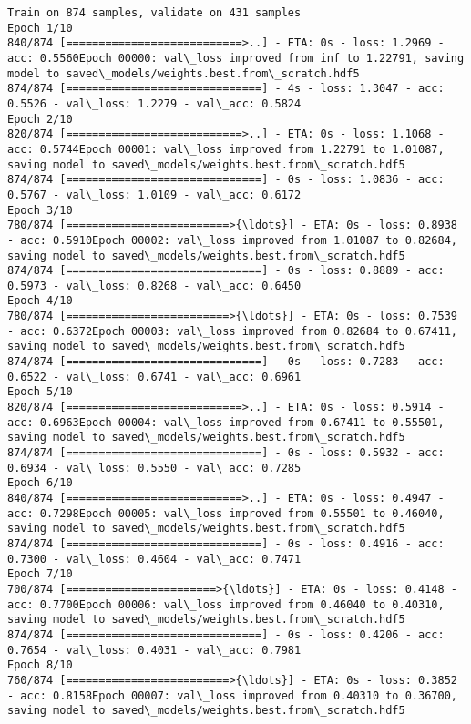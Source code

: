 \documentclass[11pt]{article}
\begin{document}
    \begin{Verbatim}[commandchars=\\\{\}]
Train on 874 samples, validate on 431 samples
Epoch 1/10
840/874 [===========================>..] - ETA: 0s - loss: 1.2969 - acc: 0.5560Epoch 00000: val\_loss improved from inf to 1.22791, saving model to saved\_models/weights.best.from\_scratch.hdf5
874/874 [==============================] - 4s - loss: 1.3047 - acc: 0.5526 - val\_loss: 1.2279 - val\_acc: 0.5824
Epoch 2/10
820/874 [===========================>..] - ETA: 0s - loss: 1.1068 - acc: 0.5744Epoch 00001: val\_loss improved from 1.22791 to 1.01087, saving model to saved\_models/weights.best.from\_scratch.hdf5
874/874 [==============================] - 0s - loss: 1.0836 - acc: 0.5767 - val\_loss: 1.0109 - val\_acc: 0.6172
Epoch 3/10
780/874 [=========================>{\ldots}] - ETA: 0s - loss: 0.8938 - acc: 0.5910Epoch 00002: val\_loss improved from 1.01087 to 0.82684, saving model to saved\_models/weights.best.from\_scratch.hdf5
874/874 [==============================] - 0s - loss: 0.8889 - acc: 0.5973 - val\_loss: 0.8268 - val\_acc: 0.6450
Epoch 4/10
780/874 [=========================>{\ldots}] - ETA: 0s - loss: 0.7539 - acc: 0.6372Epoch 00003: val\_loss improved from 0.82684 to 0.67411, saving model to saved\_models/weights.best.from\_scratch.hdf5
874/874 [==============================] - 0s - loss: 0.7283 - acc: 0.6522 - val\_loss: 0.6741 - val\_acc: 0.6961
Epoch 5/10
820/874 [===========================>..] - ETA: 0s - loss: 0.5914 - acc: 0.6963Epoch 00004: val\_loss improved from 0.67411 to 0.55501, saving model to saved\_models/weights.best.from\_scratch.hdf5
874/874 [==============================] - 0s - loss: 0.5932 - acc: 0.6934 - val\_loss: 0.5550 - val\_acc: 0.7285
Epoch 6/10
840/874 [===========================>..] - ETA: 0s - loss: 0.4947 - acc: 0.7298Epoch 00005: val\_loss improved from 0.55501 to 0.46040, saving model to saved\_models/weights.best.from\_scratch.hdf5
874/874 [==============================] - 0s - loss: 0.4916 - acc: 0.7300 - val\_loss: 0.4604 - val\_acc: 0.7471
Epoch 7/10
700/874 [=======================>{\ldots}] - ETA: 0s - loss: 0.4148 - acc: 0.7700Epoch 00006: val\_loss improved from 0.46040 to 0.40310, saving model to saved\_models/weights.best.from\_scratch.hdf5
874/874 [==============================] - 0s - loss: 0.4206 - acc: 0.7654 - val\_loss: 0.4031 - val\_acc: 0.7981
Epoch 8/10
760/874 [=========================>{\ldots}] - ETA: 0s - loss: 0.3852 - acc: 0.8158Epoch 00007: val\_loss improved from 0.40310 to 0.36700, saving model to saved\_models/weights.best.from\_scratch.hdf5

\end{Verbatim}
\end{document}
